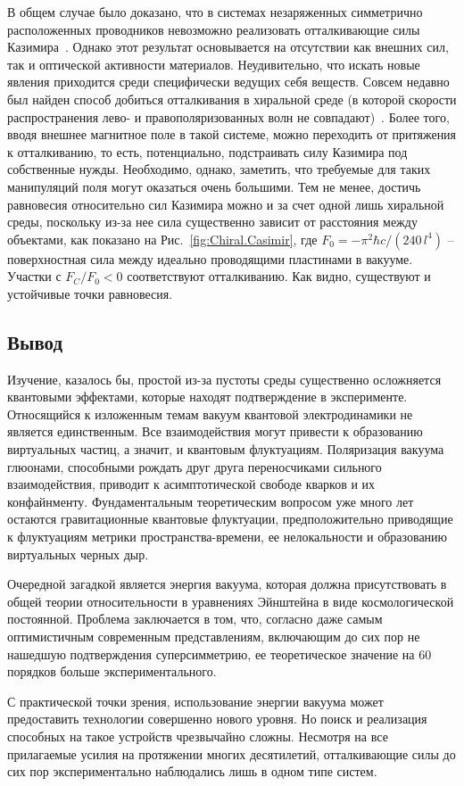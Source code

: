В общем случае было доказано, что в системах незаряженных симметрично расположенных проводников невозможно реализовать отталкивающие силы Казимира~\cite{Casimir.attr.theorem}. 
Однако этот результат основывается на отсутствии как внешних сил, так и оптической активности материалов. 
Неудивительно, что искать новые явления приходится среди специфически ведущих себя веществ. 
Совсем недавно был найден способ добиться отталкивания в хиральной среде (в которой скорости распространения лево- и правополяризованных волн не совпадают)~\cite{Repulsion.tunable}. 
Более того, вводя внешнее магнитное поле в такой системе, можно переходить от притяжения к отталкиванию, то есть, потенциально, подстраивать силу Казимира под собственные нужды. 
Необходимо, однако, заметить, что требуемые для таких манипуляций поля могут оказаться очень большими. 
Тем не менее, достичь равновесия относительно сил Казимира можно и за счет одной лишь хиральной среды, поскольку из-за нее сила существенно зависит от расстояния между объектами, как показано на Рис.~\ref{fig:Chiral.Casimir}, где $F_0 = -{\pi^2\hbar c}/{(240\,l^4)}$ -- поверхностная сила между идеально проводящими пластинами в вакууме. 
Участки с $F_C/F_0<0$ соответствуют отталкиванию. 
Как видно, существуют и устойчивые точки равновесия. 


\subsection{Вывод}

Изучение, казалось бы, простой из-за пустоты среды существенно осложняется квантовыми эффектами, которые находят подтверждение в эксперименте. 
Относящийся к изложенным темам вакуум квантовой электродинамики не является единственным.
Все взаимодействия могут привести к образованию виртуальных частиц, а значит, и квантовым флуктуациям. 
Поляризация вакуума глюонами, способными рождать друг друга переносчиками сильного взаимодействия, приводит к асимптотической свободе кварков и их конфайнменту. 
Фундаментальным теоретическим вопросом уже много лет остаются гравитационные квантовые флуктуации, предположительно приводящие к флуктуациям метрики пространства-времени, ее нелокальности и образованию виртуальных черных дыр. 

Очередной загадкой является энергия вакуума, которая должна присутствовать в общей теории относительности в уравнениях Эйнштейна в виде космологической постоянной. 
Проблема заключается в том, что, согласно даже самым оптимистичным современным представлениям, включающим до сих пор не нашедшую подтверждения суперсимметрию, ее теоретическое значение на 60 порядков больше экспериментального. 

С практической точки зрения, использование энергии вакуума может предоставить технологии совершенно нового уровня. Но поиск и реализация способных на такое устройств чрезвычайно сложны. Несмотря на все прилагаемые усилия на протяжении многих десятилетий, отталкивающие силы до сих пор экспериментально наблюдались лишь в одном типе систем. 



